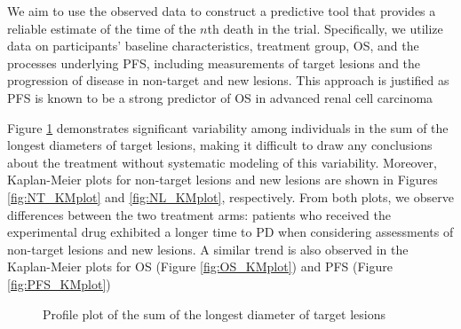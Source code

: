 We aim to use the observed data to construct a predictive tool that provides a reliable estimate of the time of the $n$th death in the trial. Specifically, we utilize data on participants' baseline characteristics, treatment group, \ac{OS}, and the processes underlying \ac{PFS}, including measurements of target lesions and the progression of disease in non-target and new lesions. This approach is justified as \ac{PFS} is known to be a strong predictor of \ac{OS} in advanced renal cell carcinoma \citep{heng2011progression}

Figure \ref{fig:profile_LD} demonstrates significant variability among individuals in the sum of the longest diameters of target lesions, making it difficult to draw any conclusions about the treatment without systematic modeling of this variability. Moreover, Kaplan-Meier plots for non-target lesions and new lesions are shown in Figures \ref{fig:NT_KMplot} and \ref{fig:NL_KMplot}, respectively. From both plots, we observe differences between the two treatment arms: patients who received the experimental drug exhibited a longer time to \ac{PD} when considering assessments of non-target lesions and new lesions. A similar trend is also observed in the Kaplan-Meier plots for \ac{OS} (Figure \ref{fig:OS_KMplot}) and \ac{PFS} (Figure \ref{fig:PFS_KMplot})

\begin{figure}
    \centering
    \hfill
    \caption{Profile plot of the sum of the longest diameter of target lesions}
    \label{fig:profile_LD}
\end{figure}

